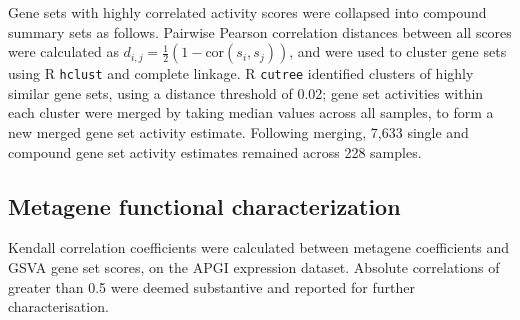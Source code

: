 \documentclass[dissertation.tex]{subfiles}
\begin{document}
Gene sets with highly correlated activity scores were collapsed into compound summary sets as follows.  Pairwise Pearson correlation distances between all scores were calculated as $d_{i,j} = \frac{1}{2}(1 - \text{cor}(s_i, s_j))$, and were used to cluster gene sets using R \texttt{hclust} and complete linkage.  R \texttt{cutree} identified clusters of highly similar gene sets, using a distance threshold of 0.02; gene set activities within each cluster were merged by taking median values across all samples, to form a new merged gene set activity estimate.  Following merging, 7,633 single and compound gene set activity estimates remained across 228 samples.

\subsection{Metagene functional characterization}
Kendall correlation coefficients were calculated between metagene coefficients and \gls{GSVA} gene set scores, on the \gls{APGI} expression dataset.  Absolute correlations of greater than 0.5 were deemed substantive and reported for further characterisation.
\end{document}
